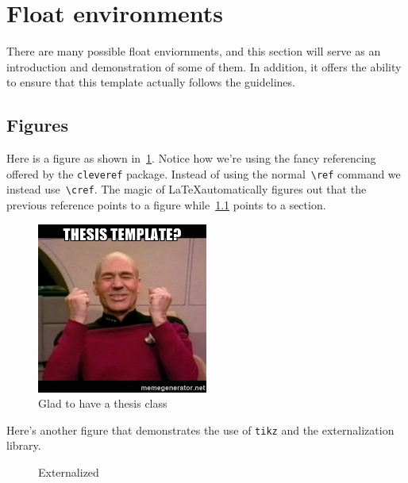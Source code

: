 \section{Float environments}
There are many possible float enviornments, and this section will serve as an introduction and demonstration of some of them.
In addition, it offers the ability to ensure that this template actually follows the guidelines.

\subsection{Figures}\label{ssec:figures}

Here is a figure as shown in~\cref{fig:picard}.
Notice how we're using the fancy referencing offered by the \verb+cleveref+ package. 
Instead of using the normal~\verb+\ref+ command we instead use~\verb+\cref+. 
The magic of \LaTeX automatically figures out that the previous reference points to a figure while~\cref{ssec:figures} points to a section.

\begin{figure}
    \centering
    \includegraphics[width=0.5\textwidth]{figures/picard_yes.jpg}
    \caption[Damage report!]{Glad to have a thesis class\label{fig:picard}}
\end{figure}

Here's another figure that demonstrates the use of \texttt{tikz} and the externalization library.
\begin{figure}
    \centering
    \caption{Externalized\label{fig:tikz}}
\end{figure}

